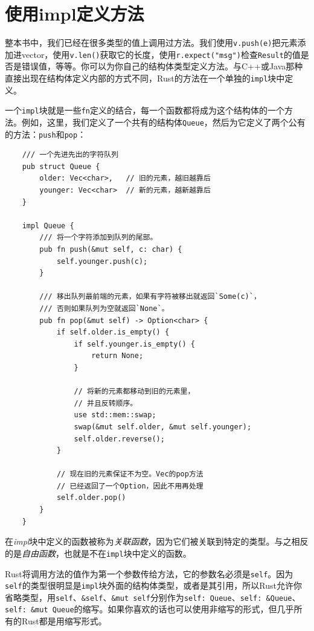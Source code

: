 \section{使用impl定义方法}\label{method}

整本书中，我们已经在很多类型的值上调用过方法。我们使用\texttt{v.push(e)}把元素添加进vector，使用\texttt{v.len()}获取它的长度，使用\texttt{r.expect("msg")}检查\texttt{Result}的值是否是错误值，等等。你可以为你自己的结构体类型定义方法。与C++或Java那种直接出现在结构体定义内部的方式不同，Rust的方法在一个单独的\texttt{impl}块中定义。

一个\texttt{impl}块就是一些\texttt{fn}定义的结合，每一个函数都将成为这个结构体的一个方法。例如，这里，我们定义了一个共有的结构体\texttt{Queue}，然后为它定义了两个公有的方法：\texttt{push}和\texttt{pop}：
\begin{verbatim}
    /// 一个先进先出的字符队列
    pub struct Queue {
        older: Vec<char>,   // 旧的元素，越旧越靠后
        younger: Vec<char>  // 新的元素，越新越靠后
    }

    impl Queue {
        /// 将一个字符添加到队列的尾部。
        pub fn push(&mut self, c: char) {
            self.younger.push(c);
        }

        /// 移出队列最前端的元素，如果有字符被移出就返回`Some(c)`，
        /// 否则如果队列为空就返回`None`。
        pub fn pop(&mut self) -> Option<char> {
            if self.older.is_empty() {
                if self.younger.is_empty() {
                    return None;
                }

                // 将新的元素都移动到旧的元素里，
                // 并且反转顺序。
                use std::mem::swap;
                swap(&mut self.older, &mut self.younger);
                self.older.reverse();
            }

            // 现在旧的元素保证不为空。Vec的pop方法
            // 已经返回了一个Option，因此不用再处理
            self.older.pop()
        }
    }
\end{verbatim}

在\emph{impl}块中定义的函数被称为\emph{关联函数}，因为它们被关联到特定的类型。与之相反的是\emph{自由函数}，也就是不在\texttt{impl}块中定义的函数。

Rust将调用方法的值作为第一个参数传给方法，它的参数名必须是\texttt{self}。因为\texttt{self}的类型很明显是\texttt{impl}块外面的结构体类型，或者是其引用，所以Rust允许你省略类型，用\texttt{self}、\texttt{\&self}、\texttt{\&mut self}分别作为\texttt{self: Queue}、\texttt{self: \&Queue}、\texttt{self: \&mut Queue}的缩写。如果你喜欢的话也可以使用非缩写的形式，但几乎所有的Rust都是用缩写形式。

